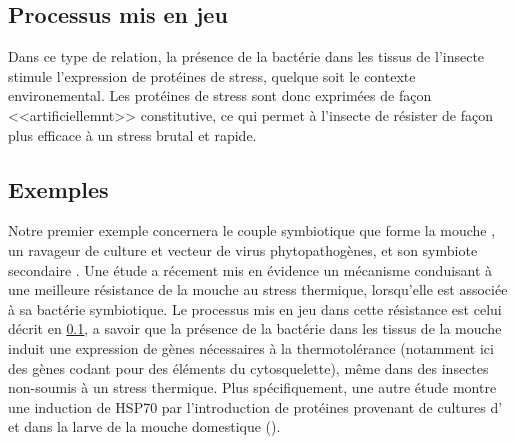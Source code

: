 \subsection{Processus mis en jeu} %
\label{sub:processus_mis_en_jeu}

Dans ce type de relation, la présence de la bactérie dans les tissus de
l'insecte stimule l'expression de protéines de stress, quelque soit le
contexte environemental. Les protéines de stress sont donc exprimées de façon
<<artificiellemnt>> constitutive, ce qui permet à l'insecte de résister de façon
plus efficace à un stress brutal et rapide.

\subsection{Exemples} %
\label{sub:exemples}


Notre premier exemple concernera le couple symbiotique que forme la mouche
, un ravageur de culture et vecteur de virus
phytopathogènes, et son symbiote secondaire . Une étude
\cite{brumin2011} a récement mis en évidence un mécanisme conduisant à une
meilleure résistance de la mouche au stress thermique, lorsqu'elle est
associée à sa bactérie symbiotique. Le processus mis en jeu dans cette
résistance est celui décrit en \ref{sub:processus_mis_en_jeu}, a savoir que la
présence de la bactérie dans les tissus de la mouche induit une expression de
gènes nécessaires à la thermotolérance (notamment ici des gènes codant pour
des éléments du cytosquelette), même dans des insectes non-soumis à un stress
thermique.
Plus spécifiquement, une autre étude \cite{tang2012} montre une induction de HSP70 par l'introduction de protéines provenant de cultures d' et  dans la larve de la mouche domestique ().